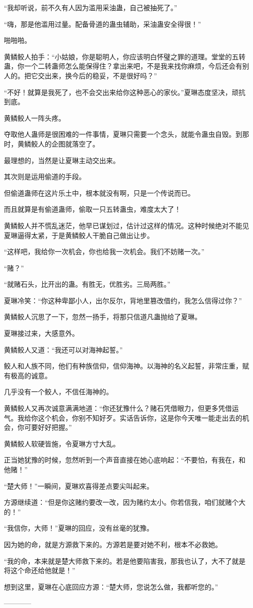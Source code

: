 \begin{this_body}
“我却听说，前不久有人因为滥用采油蛊，自己被抽死了。”

“嗨，那是他滥用过量。配备骨道的蛊虫辅助，采油蛊安全得很！”

啪啪啪。

黄鳞鲛人拍手：“小姑娘，你是聪明人，你应该明白怀璧之罪的道理。堂堂的五转蛊，你一个二转蛊师怎么能保得住？拿出来吧，不是我来找你麻烦，今后还会有别人的。把它交出来，换今后的稳妥，不是很好吗？”

“不好！就算是我死了，也不会交出来给你这种恶心的家伙。”夏琳态度坚决，顽抗到底。

黄鳞鲛人一阵头疼。

夺取他人蛊师是很困难的一件事情，夏琳只需要一个念头，就能令蛊虫自毁。到那时，黄鳞鲛人的企图就落空了。

最理想的，当然是让夏琳主动交出来。

其次则是运用偷道的手段。

但偷道蛊师在这片乐土中，根本就没有啊，只是一个传说而已。

而且就算是有偷道蛊师，偷取一只五转蛊虫，难度太大了！

黄鳞鲛人并不慌乱迷茫，他早已谋划过，估计过这样的情况。这种时候绝对不能见夏琳逼得太紧，于是黄鳞鲛人干脆自己做出让步。

“这样吧，我给你一次机会，你也给我一次机会。我们不妨赌一次。”

“赌？”

“就赌石头，比开出的蛊。有胜无，优胜劣。三局两胜。”

夏琳冷笑：“你这种卑鄙小人，出尔反尔，背地里篡改借约，我怎么信得过你？”

黄鳞鲛人沉思了一下，忽然一扬手，将那只信道凡蛊抛给了夏琳。

夏琳接过来，大感意外。

黄鳞鲛人又道：“我还可以对海神起誓。”

鲛人和人族不同，他们有种族信仰，信仰海神。以海神的名义起誓，非常庄重，赋有极高的诚意。

几乎没有一个鲛人，不信任海神的。

黄鳞鲛人又再次诚意满满地道：“你还犹豫什么？赌石凭借眼力，但更多凭借运气。我给你这个机会，你别不知好歹。实话告诉你，这是你今天唯一能走出去的机会，你可要好好把握。”

黄鳞鲛人软硬皆施，令夏琳方寸大乱。

正当她犹豫的时候，忽然听到一个声音直接在她心底响起：“不要怕，有我在，和他赌！”

“楚大师！”一瞬间，夏琳欢喜得差点要尖叫起来。

方源继续道：“但是你这赌约要改一改，因为赌约太小。你若信我，咱们就赌个大的！”

“我信你，大师！”夏琳的回应，没有丝毫的犹豫。

因为她的命，就是方源救下来的。方源若是要对她不利，根本不必救她。

“我的命，本来就是楚大师救下来的。若是他要陷害我，那我也认了，大不了就是将这个命还给他就是！”

想到这里，夏琳在心底回应方源：“楚大师，您说怎么做，我都听您的。”

------------

\end{this_body}


